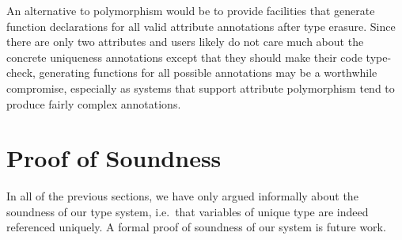 An alternative to polymorphism would be to provide facilities that generate function declarations for all valid attribute annotations after type erasure. Since there are only two attributes and users likely do not care much about the concrete uniqueness annotations except that they should make their code type-check, generating functions for all possible annotations may be a worthwhile compromise, especially as systems that support attribute polymorphism tend to produce fairly complex annotations.

\section{Proof of Soundness}
In all of the previous sections, we have only argued informally about the soundness of our type system, i.e.\ that variables of unique type are indeed referenced uniquely. A formal proof of soundness of our system is future work.